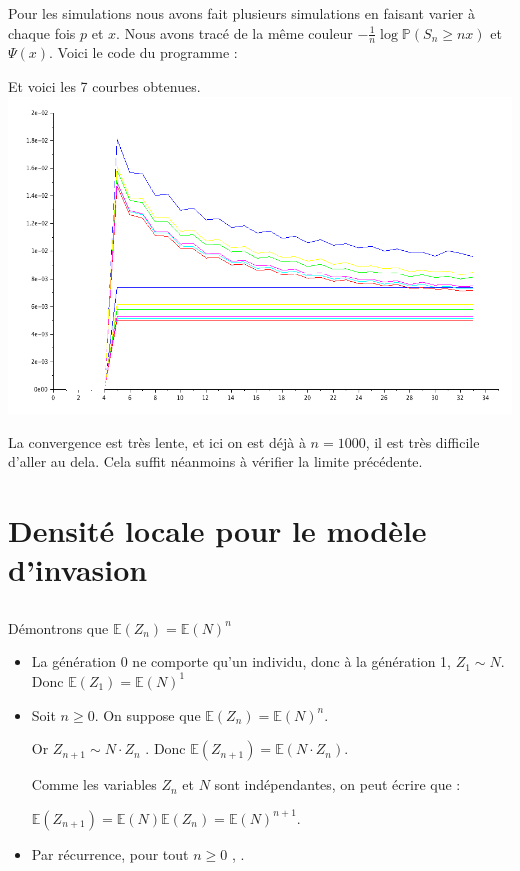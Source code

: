 \documentclass[12pt,titlepage=true]{article}
\newcommand{\esp}{\mathbb{E}}
\renewcommand{\P}{\mathbb{P}}
\begin{document}
			Pour les simulations nous avons fait plusieurs simulations en faisant varier à chaque fois $p$ et $x$. Nous avons tracé de la même couleur $-\frac{1}{n} \log \P(S_n \geqslant nx)$ et $\Psi(x)$.
			Voici le code du programme :
			
			Et voici les 7 courbes obtenues. \\
			\includegraphics{../Scilab/Images/1_5.png}
			
			La convergence est très lente, et ici on est déjà à $n = 1 000$, il est très difficile d'aller au dela. Cela suffit néanmoins à vérifier la limite précédente.
		
	\section{Densité locale pour le modèle d'invasion}
		\subsection{} %
			
			\paragraph{} Démontrons que $\esp(Z_n)=\esp(N)^n$
			\begin{itemize}
			
				\item	La génération 0 ne comporte qu'un individu, donc à la génération 1, $Z_1\sim N$. Donc $\esp(Z_1)=\esp(N)^1$
				
				\item	Soit $n\geqslant 0$. On suppose que $\esp(Z_n)=\esp(N)^n$.
				
						Or $Z_{n+1}\sim N \cdotp Z_n$ . Donc $\esp(Z_{n+1}) = \esp(N \cdotp Z_n)$.
						
						Comme les variables $Z_n$ et $N$ sont indépendantes, on peut écrire que :
						
						$\esp(Z_{n+1}) = \esp(N) \esp( Z_n) = \esp(N)^{n+1}$.
				\item Par récurrence, pour tout $n\geqslant0 $ , \fbox{$\esp(Z_n)=\esp(N)^n$}.
				
			\end{itemize}
	
\end{document}
